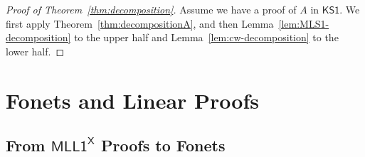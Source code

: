 \documentclass[conference,twosided,10pt]{IEEEtran}
\newcommand{\todo}[1]{{\color{red}     \noindent[\![\![{\bf TODO: }#1]\!]\!]}}
\theoremstyle{definition}
\newcommand*{\FOMLL}{\mathsf{MLL1^X}}
\newcommand*{\FOKS}{\mathsf{KS1}}
\begin{document}
\begin{proof}[Proof of Theorem~\ref{thm:decomposition}]
  Assume we have a proof of $A$ in $\FOKS$. We first apply
  Theorem~\ref{thm:decompositionA}, and then
  Lemma~\ref{lem:MLS1-decomposition} to the upper half and
  Lemma~\ref{lem:cw-decomposition} to the lower half.
\end{proof}


\section{Fonets and Linear Proofs}


\subsection{From $\FOMLL$ Proofs to Fonets}
\end{document}

